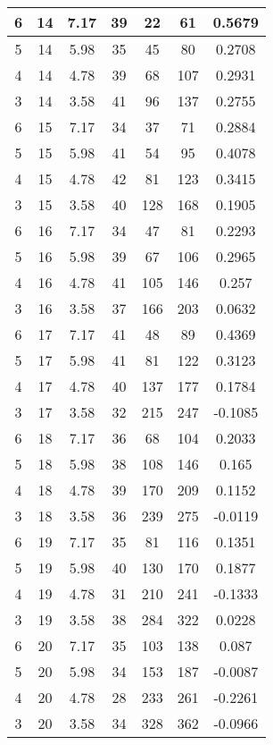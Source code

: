 \documentclass[letterpaper, 12pt]{article}
\begin{document}
\begin{longtable}{|c|c|c|c|c|c|c|}
\hline
6 & 14 & 7.17 & 39 & 22 & 61 & 0.5679 \\
\hline
5 & 14 & 5.98 & 35 & 45 & 80 & 0.2708 \\
\hline
4 & 14 & 4.78 & 39 & 68 & 107 & 0.2931 \\
\hline
3 & 14 & 3.58 & 41 & 96 & 137 & 0.2755 \\
\hline
6 & 15 & 7.17 & 34 & 37 & 71 & 0.2884 \\
\hline
5 & 15 & 5.98 & 41 & 54 & 95 & 0.4078 \\
\hline
4 & 15 & 4.78 & 42 & 81 & 123 & 0.3415 \\
\hline
3 & 15 & 3.58 & 40 & 128 & 168 & 0.1905 \\
\hline
6 & 16 & 7.17 & 34 & 47 & 81 & 0.2293 \\
\hline
5 & 16 & 5.98 & 39 & 67 & 106 & 0.2965 \\
\hline
4 & 16 & 4.78 & 41 & 105 & 146 & 0.257 \\
\hline
3 & 16 & 3.58 & 37 & 166 & 203 & 0.0632 \\
\hline
6 & 17 & 7.17 & 41 & 48 & 89 & 0.4369 \\
\hline
5 & 17 & 5.98 & 41 & 81 & 122 & 0.3123 \\
\hline
4 & 17 & 4.78 & 40 & 137 & 177 & 0.1784 \\
\hline
3 & 17 & 3.58 & 32 & 215 & 247 & -0.1085 \\
\hline
6 & 18 & 7.17 & 36 & 68 & 104 & 0.2033 \\
\hline
5 & 18 & 5.98 & 38 & 108 & 146 & 0.165 \\
\hline
4 & 18 & 4.78 & 39 & 170 & 209 & 0.1152 \\
\hline
3 & 18 & 3.58 & 36 & 239 & 275 & -0.0119 \\
\hline
6 & 19 & 7.17 & 35 & 81 & 116 & 0.1351 \\
\hline
5 & 19 & 5.98 & 40 & 130 & 170 & 0.1877 \\
\hline
4 & 19 & 4.78 & 31 & 210 & 241 & -0.1333 \\
\hline
3 & 19 & 3.58 & 38 & 284 & 322 & 0.0228 \\
\hline
6 & 20 & 7.17 & 35 & 103 & 138 & 0.087 \\
\hline
5 & 20 & 5.98 & 34 & 153 & 187 & -0.0087 \\
\hline
4 & 20 & 4.78 & 28 & 233 & 261 & -0.2261 \\
\hline
3 & 20 & 3.58 & 34 & 328 & 362 & -0.0966 \\
\hline
\end{longtable}
\end{document}
